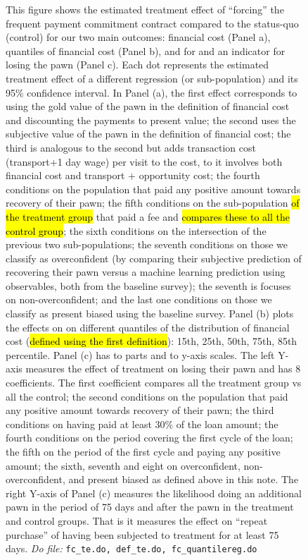 \documentclass[11pt]{article}
\begin{document}
\begin{figure}[H]
        This figure shows the estimated treatment effect of ``forcing'' the frequent payment commitment contract compared to the status-quo (control) for our two main outcomes: financial cost (Panel a), quantiles of financial cost (Panel b), and for and an indicator for losing the pawn (Panel c). Each dot represents the estimated treatment effect of a different regression (or sub-population) and its 95\% confidence interval. In Panel (a), the first effect corresponds to using the gold value of the pawn in the definition of financial cost and discounting the payments to present value; the second uses the subjective value of the pawn in the definition of financial cost; the third is analogous to the second but adds transaction cost (transport+1 day wage) per visit to the cost, to it involves both financial cost and transport + opportunity cost; the fourth conditions on the population that paid any positive amount towards recovery of their pawn; the fifth conditions on the sub-population \hl{of the treatment group} that paid a fee and \hl{compares these to all the control group}; the sixth conditions on the intersection of the previous two sub-populations; the seventh conditions on those we classify as overconfident (by comparing their subjective prediction of recovering their pawn versus a machine learning prediction using observables, both from the baseline survey); the seventh is focuses on non-overconfident; and the last one conditions on those we classify as present biased using the baseline survey. Panel (b) plots the effects on   on different quantiles of the distribution of financial cost (\hl{defined using the first definition}): 15th, 25th, 50th, 75th, 85th percentile. Panel (c) has to parts and to y-axis scales. The left Y-axis measures the effect of treatment on losing their pawn and has 8 coefficients. The first coefficient compares all the treatment group vs all the control; the second conditions on the population that paid any positive amount towards recovery of their pawn; the third conditions on having paid at least 30\% of the loan amount; the fourth conditions on the period covering the first cycle of the loan; the fifth on the period of the first cycle and paying any positive amount; the sixth, seventh and eight on overconfident, non-overconfident, and present biased as defined above in this note. The right Y-axis of Panel (c) measures the likelihood doing an additional pawn in the period of 75 days and after the pawn in the treatment and control groups. That is it measures the effect on ``repeat purchase'' of having been subjected to treatment for at least 75 days.
      \textit{Do file: }  \texttt{fc\_te.do, def\_te.do, fc\_quantilereg.do}
\end{figure}
\end{document}
